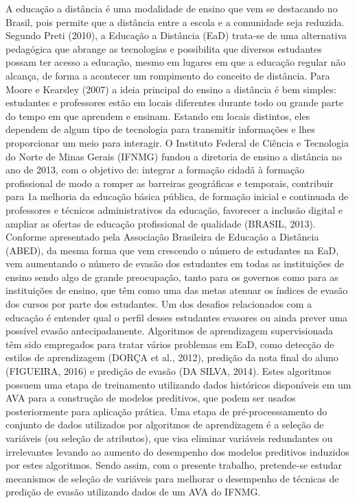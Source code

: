 \documentclass[
	oneside,
	12pt,				%
	a4paper,			%
	english,			%
	brazil,				%
	article
	]{abntex2}
\begin{document}
A educação a distância é uma modalidade de ensino que vem se destacando no Brasil,
pois permite que a distância entre a escola e a comunidade seja reduzida. Segundo Preti (2010),
a Educação a Distância (EaD) trata-se de uma alternativa pedagógica que abrange as
tecnologias e possibilita que diversos estudantes possam ter acesso a educação, mesmo em
lugares em que a educação regular não alcança, de forma a acontecer um rompimento do
conceito de distância. Para Moore e Kearsley (2007) a ideia principal do ensino a distância é
bem simples: estudantes e professores estão em locais diferentes durante todo ou grande parte
do tempo em que aprendem e ensinam. Estando em locais distintos, eles dependem de algum
tipo de tecnologia para transmitir informações e lhes proporcionar um meio para interagir.
O Instituto Federal de Ciência e Tecnologia do Norte de Minas Gerais (IFNMG) fundou
a diretoria de ensino a distância no ano de 2013, com o objetivo de: integrar a formação cidadã
à formação profissional de modo a romper as barreiras geográficas e temporais, contribuir para
1a melhoria da educação básica pública, de formação inicial e continuada de professores e
técnicos administrativos da educação, favorecer a inclusão digital e ampliar as ofertas de
educação profissional de qualidade (BRASIL, 2013).
Conforme apresentado pela Associação Brasileira de Educação a Distância (ABED), da
mesma forma que vem crescendo o número de estudantes na EaD, vem aumentando o número
de evasão dos estudantes em todas as instituições de ensino sendo algo de grande preocupação,
tanto para os governos como para as instituições de ensino, que têm como uma das metas
atenuar os índices de evasão dos cursos por parte dos estudantes. Um dos desafios relacionados
com a educação é entender qual o perfil desses estudantes evasores ou ainda prever uma
possível evasão antecipadamente.
Algoritmos de aprendizagem supervisionada têm sido empregados para tratar vários
problemas em EaD, como detecção de estilos de aprendizagem (DORÇA et al., 2012), predição
da nota final do aluno (FIGUEIRA, 2016) e predição de evasão (DA SILVA, 2014). Estes
algoritmos possuem uma etapa de treinamento utilizando dados históricos disponíveis em um
AVA para a construção de modelos preditivos, que podem ser usados posteriormente para
aplicação prática.
Uma etapa de pré-processsamento do conjunto de dados utilizados por algoritmos de
aprendizagem é a seleção de variáveis (ou seleção de atributos), que visa eliminar variáveis
redundantes ou irrelevantes levando ao aumento do desempenho dos modelos preditivos
induzidos por estes algoritmos. Sendo assim, com o presente trabalho, pretende-se estudar
mecanismos de seleção de variáveis para melhorar o desempenho de técnicas de predição de
evasão utilizando dados de um AVA do IFNMG.
\end{document}
